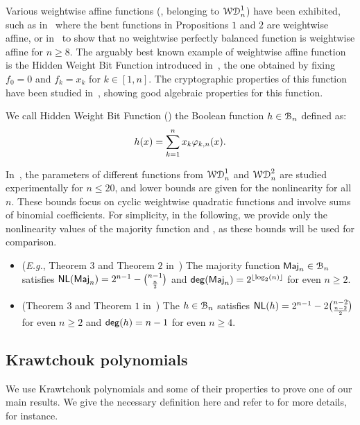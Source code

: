 \documentclass{llncs}
\begin{document}
Various weightwise affine functions (\ie, belonging to $\mathcal{WD}^{1}_{n}$) have been exhibited, such as in~\cite{TOSC:CarMeaRot17} where the bent functions in Propositions $1$ and $2$ are weightwise affine, or in~\cite{DAM:GinMea22} to show that no weightwise perfectly balanced function is weightwise affine for $n\geq 8$. The arguably best known example of weightwise affine function is the Hidden Weight Bit Function introduced in~\cite{IEEE:Bryant91}, the one obtained by fixing $f_0=0$ and $f_k=x_k$ for $k \in [1,n]$. The cryptographic properties of this function have been studied in~\cite{DAM:WCST14}, showing good algebraic properties for this function.

\begin{definition}\label{def:hwbf}
    We call Hidden Weight Bit Function (\hwbf{}) the Boolean function $h\in\mathcal{B}_n$ defined as:
	\[
		h(x)=\sum_{k=1}^{n}x_k\varphi_{k,n}(x).
	\]
\end{definition}

In~\cite{DAM:MeaOza24}, the parameters of different functions from $\mathcal{WD}^{1}_{n}$ and $\mathcal{WD}^{2}_{n}$ are studied experimentally for $n\leq 20$, and lower bounds are given for the nonlinearity for all $n$. These bounds focus on cyclic weightwise quadratic functions and involve sums of binomial coefficients. For simplicity, in the following, we provide only the nonlinearity values of the majority function and \hwbf{}, as these bounds will be used for comparison.

\begin{Prop}\label{prop:wwd1}\mbox{}
	\begin{itemize}
		\item (\textit{E.g.}, Theorem $3$ and Theorem $2$ in~\cite{DCC:DalMaiSar06}) The majority function $\mathsf{Maj}_n\in\mathcal{B}_n$ satisfies $\mathsf{NL}(\mathsf{Maj}_n)=2^{n-1}-\binom{n-1}{\frac n2}$ and $\mathsf{deg}(\mathsf{Maj}_n)=2^{\lfloor\log_2(n)\rfloor}$ for even $n\geq 2$.
		\item (Theorem $3$ and Theorem $1$ in~\cite{DAM:WCST14}) The \hwbf{} $h\in\mathcal{B}_n$ satisfies $\mathsf{NL}(h)=2^{n-1}-2\binom{n-2}{\frac{n-2}{2}}$ for even $n\geq 2$ and $\mathsf{deg}(h)=n-1$ for even $n\geq 4$.
	\end{itemize}
\end{Prop}

\subsection{Krawtchouk polynomials}

We use Krawtchouk polynomials and some of their properties to prove one of our main results. We give the necessary definition here and refer to \cite{book:MacSlo78} for more details, for instance.
\end{document}
